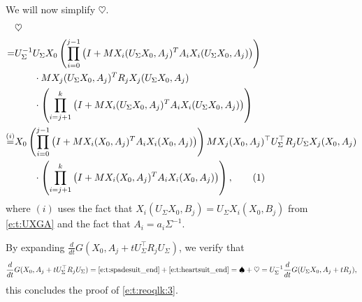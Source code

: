 \documentclass{article}
\newcommand*\lrp[1]{\left( #1 \right)}
\newcommand\numberthis{\addtocounter{equation}{1}\tag{\theequation}}
\newcommand{\US}{U_\Sigma}
\begin{document}
We will now simplify $\heartsuit$.
{\allowdisplaybreaks
\begin{align*}
& \heartsuit\\
=& \US^{-1} \US X_0 \lrp{ \prod_{i=0}^{j-1} \lrp{I + M X_i(\US X_0,A_j)^T A_i X_i(\US X_0,A_j)}} \\
&\qquad \cdot M X_j(\US X_0,A_j)^T R_j X_j(\US X_0,A_j) \\
&\qquad \cdot \lrp{ \prod_{i=j+1}^{k} \lrp{I + M X_i(\US X_0,A_j)^T A_i X_i(\US X_0,A_j)}}\\
\overset{(i)}{=}& X_0 \lrp{ \prod_{i=0}^{j-1} \lrp{I + M X_i(X_0,A_j)^T A_i X_i(X_0,A_j)}} M X_j(X_0,A_j)^\top \US^\top R_j \US X_j(X_0,A_j)\\
&\qquad \cdot \lrp{ \prod_{i=j+1}^{k} \lrp{I + M X_i(X_0,A_j)^T A_i X_i(X_0,A_j)}},
\numberthis \label{e:t:heartsuit_end}
\end{align*}
}
where $(i)$ uses the fact that $X_i(\US X_0, B_j) = \US X_i(X_0, B_j)$ from \eqref{e:t:UXGA} and the fact that $A_i = a_i \Sigma^{-1}$.

By expanding $\frac{d}{dt} G(X_0, A_j + t \US^{\top} R_j \US)$, we verify that 
\begin{align*}
\frac{d}{dt} G(X_0, A_j + t \US^{\top} R_j \US) = \eqref{e:t:spadesuit_end} + \eqref{e:t:heartsuit_end}  
= \spadesuit + \heartsuit
= \US^{-1} \frac{d}{dt} G(\US X_0, A_j + t R_j),
\end{align*}
this concludes the proof of \eqref{e:t:reoqlk:3}.
\end{document}
